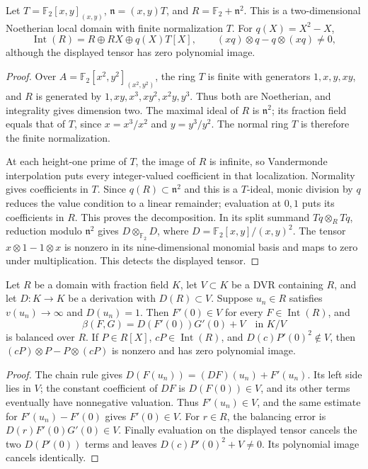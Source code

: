 \begin{example}\label{ex:two-dimensional-split-tensor-kernel}
Let $T=\mathbb F_2[x,y]_{(x,y)}$, $\mathfrak n=(x,y)T$, and
$R=\mathbb F_2+\mathfrak n^2$. This is a two-dimensional
Noetherian local domain with finite normalization $T$. For
$q(X)=X^2-X$,
\[
 \operatorname{Int}(R)=R\oplus RX\oplus q(X)T[X],\qquad
              (xq)\otimes q-q\otimes(xq)\ne0,
\]
although the displayed tensor has zero polynomial image.
\end{example}
\begin{proof}
Over $A=\mathbb F_2[x^2,y^2]_{(x^2,y^2)}$, the ring $T$ is finite
with generators $1,x,y,xy$, and $R$ is generated by
$1,xy,x^3,xy^2,x^2y,y^3$. Thus both are Noetherian, and integrality
gives dimension two. The maximal ideal of $R$ is $\mathfrak n^2$;
its fraction field equals that of $T$, since $x=x^3/x^2$ and
$y=y^3/y^2$. The normal ring $T$ is therefore the finite
normalization.

At each height-one prime of $T$, the image of $R$ is infinite,
so Vandermonde interpolation puts every integer-valued coefficient
in that localization. Normality gives coefficients in $T$.
Since $q(R)\subset\mathfrak n^2$ and this is a $T$-ideal, monic
division by $q$ reduces the value condition to a linear remainder;
evaluation at $0,1$ puts its coefficients in $R$. This proves the
decomposition. In its split summand $Tq\otimes_RTq$, reduction
modulo $\mathfrak n^2$ gives $D\otimes_{\mathbb F_2}D$, where
$D=\mathbb F_2[x,y]/(x,y)^2$. The tensor $x\otimes1-1\otimes x$
is nonzero in its nine-dimensional monomial basis and maps to
zero under multiplication. This detects the displayed tensor.
\end{proof}

\begin{lemma}\label{lem:derivation-detects-polynomial-torsion}
Let $R$ be a domain with fraction field $K$, let $V\subset K$ be
a DVR containing $R$, and let $D:K\to K$ be a derivation with
$D(R)\subset V$. Suppose $u_n\in R$ satisfies $v(u_n)\to\infty$
and $D(u_n)=1$. Then $F'(0)\in V$ for every
$F\in\operatorname{Int}(R)$, and
\[
       \beta(F,G)=D(F'(0))G'(0)+V\quad\text{in }K/V
\]
is balanced over $R$. If $P\in R[X]$, $cP\in\operatorname{Int}(R)$,
and $D(c)P'(0)^2\notin V$, then
$(cP)\otimes P-P\otimes(cP)$ is nonzero and has zero polynomial
image.
\end{lemma}
\begin{proof}
The chain rule gives
$D(F(u_n))=(DF)(u_n)+F'(u_n)$. Its left side lies in $V$;
the constant coefficient of $DF$ is $D(F(0))\in V$, and its other
terms eventually have nonnegative valuation. Thus $F'(u_n)\in V$,
and the same estimate for $F'(u_n)-F'(0)$ gives $F'(0)\in V$.
For $r\in R$, the balancing error is
$D(r)F'(0)G'(0)\in V$. Finally evaluation on the displayed tensor
cancels the two $D(P'(0))$ terms and leaves
$D(c)P'(0)^2+V\ne0$. Its polynomial image cancels identically.
\end{proof}

